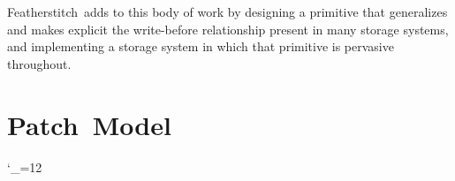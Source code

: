 \documentclass[9pt,twocolumn,letterpaper]{article}
\let\mathpatchset\mathcal
\def\mathpatchset#1{\text{\bfseries\itshape#1}}
\newcommand{\Kudos}{Featherstitch}
\newcommand{\Patch}{Patch}
\newcommand{\Noop}{Empty}
\newcommand{\Nrb}{Hard}
\newcommand{\Rb}{Soft}
\begin{document}
\Kudos\ adds to this body of work by designing a primitive that
generalizes and makes explicit the write-before relationship
present in many storage systems, and implementing a storage system in which
that primitive is pervasive throughout.


\section{\Patch\ Model}
\label{sec:patch}

\makeatletter
\let\emptyset\varnothing
{\catcode`\_=12\gdef\_{_}}
\newcommand{\PBlock}[1]{\ensuremath{\textit{blk}[{#1}]}}
\newcommand{\PB}{\ensuremath{B}}
\newcommand{\PSetlim}[1]{\def\@next{#1}\ifx\@next\@empty\else_{\@next}\fi}
\newcommand{\PMem}[1][]{\ensuremath{\mathpatchset{U}\PSetlim{#1}}}
\newcommand{\PInf}[1][]{\ensuremath{\mathpatchset{F}\PSetlim{#1}}}
\newcommand{\PDisk}[1][]{\ensuremath{\mathpatchset{C}\PSetlim{#1}}}
\newcommand{\PHard}[1][]{\ensuremath{\textit{\Nrb}\PSetlim{#1}}}
\newcommand{\PSoft}[1][]{\ensuremath{\textit{\Rb}\PSetlim{#1}}}
\newcommand{\PEmpty}[1][]{\ensuremath{\textit{\Noop}\PSetlim{#1}}}
\newcommand{\PDDepset}[1]{\ensuremath{\textit{ddep}[#1]}}
\newcommand{\PDepend}{\ensuremath{\leadsto}}
\newcommand{\PDDepend}{\ensuremath{\rightarrow}}
\newcommand{\PDepset}[1]{\ensuremath{\textit{dep}[#1]}}
\newcommand{\PRDepset}[1]{\ensuremath{\textit{RDep}[#1]}}
\makeatother
\end{document}
